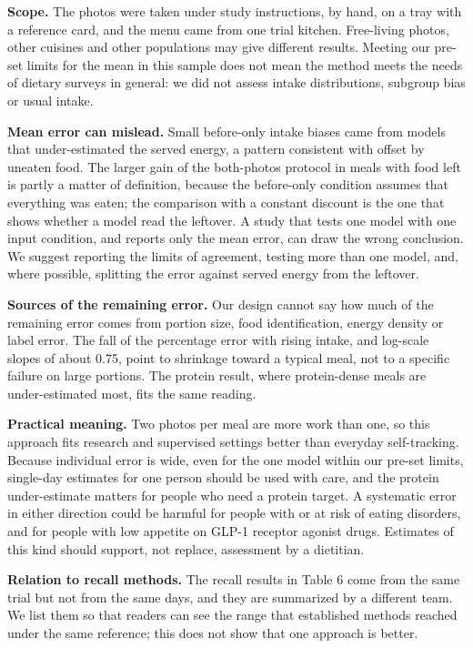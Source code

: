 \documentclass[
  11pt,
  letterpaper]{article}
\begin{document}
\textbf{Scope.} The photos were taken under study instructions, by hand, on a tray with a reference card, and
the menu came from one trial kitchen. Free-living photos, other cuisines and other populations may give
different results. Meeting our pre-set limits for the mean in this sample does not mean the method meets the
needs of dietary surveys in general: we did not assess intake distributions, subgroup bias or usual intake.

\textbf{Mean error can mislead.} Small before-only intake biases came from models that under-estimated the
served energy, a pattern consistent with offset by uneaten food. The larger gain of the both-photos protocol
in meals with food left is partly a matter of definition, because the before-only condition assumes that
everything was eaten; the comparison with a constant discount is the one that shows whether a model read the
leftover. A study that tests one model with one input condition, and reports only the mean error, can draw the
wrong conclusion. We suggest reporting the limits of agreement, testing more than one model, and, where
possible, splitting the error against served energy from the leftover.

\textbf{Sources of the remaining error.} Our design cannot say how much of the remaining error comes from
portion size, food identification, energy density or label error. The fall of the percentage error with rising
intake, and log-scale slopes of about 0.75, point to shrinkage toward a typical meal, not to a specific
failure on large portions. The protein result, where protein-dense meals are under-estimated most, fits the
same reading.

\textbf{Practical meaning.} Two photos per meal are more work than one, so this approach fits research and
supervised settings better than everyday self-tracking. Because individual error is wide, even for the one
model within our pre-set limits, single-day estimates for one person should be used with care, and the protein
under-estimate matters for people who need a protein target. A systematic error in either direction could be
harmful for people with or at risk of eating disorders, and for people with low appetite on GLP-1 receptor
agonist drugs. Estimates of this kind should support, not replace, assessment by a dietitian.

\textbf{Relation to recall methods.} The recall results in Table 6 come from the same trial but not from the
same days, and they are summarized by a different team. We list them so that readers can see the range that
established methods reached under the same reference; this does not show that one approach is better.
\end{document}
